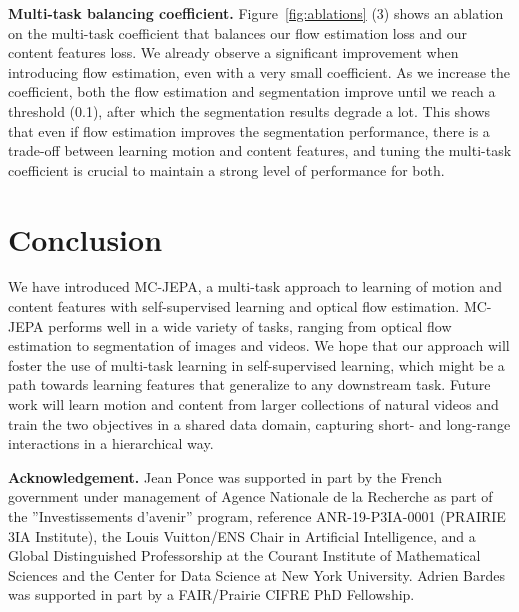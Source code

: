 \documentclass{article} %
\newcommand{\algo}{MC-JEPA}
\newcommand{\algospace}{MC-JEPA }
\begin{document}
\noindent\textbf{Multi-task balancing coefficient.} Figure~\ref{fig:ablations} (3) shows an ablation on the multi-task coefficient that balances our flow estimation loss and our content features loss. We already observe a significant improvement when introducing flow estimation, even with a very small coefficient. As we increase the coefficient, both the flow estimation and segmentation improve until we reach a threshold (0.1), after which the segmentation results degrade a lot. This shows that even if flow estimation improves the segmentation performance, there is a trade-off between learning motion and content features, and tuning the multi-task coefficient is crucial to maintain a strong level of performance for both.

\section{Conclusion}

We have introduced \algo, a multi-task approach to learning of motion and content features with self-supervised learning and optical flow estimation. \algospace performs well in a wide variety of tasks, ranging from optical flow estimation to segmentation of images and videos. We hope that our approach will foster the use of multi-task learning in self-supervised learning, which might be a path towards learning features that generalize to any downstream task. Future work will learn motion and content from larger collections of natural videos and train the two objectives in a shared data domain, capturing short- and long-range interactions in a hierarchical way.


\newpage

\textbf{Acknowledgement.} Jean Ponce was supported in part by the French government under management of Agence Nationale de la Recherche as part of the ”Investissements d’avenir” program,
reference ANR-19-P3IA-0001 (PRAIRIE 3IA Institute), the Louis Vuitton/ENS Chair in Artificial
Intelligence, and a Global Distinguished Professorship at the Courant Institute of Mathematical Sciences and the Center for Data Science at New York University. Adrien Bardes was supported in part by a FAIR/Prairie
CIFRE PhD Fellowship.




\appendix
\clearpage


\end{document}
